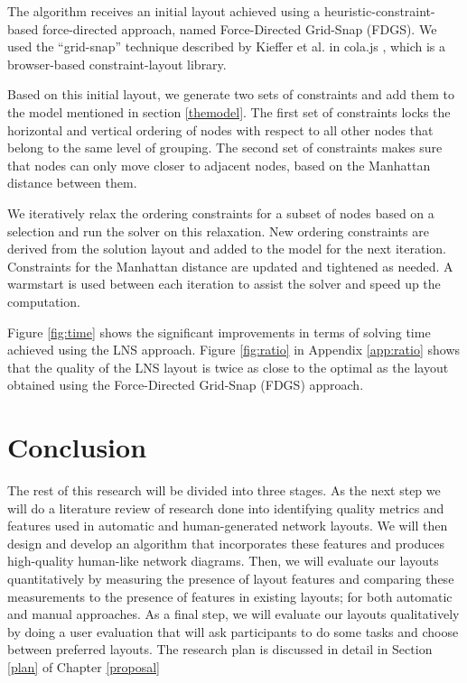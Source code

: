 \documentclass[a4paper,11pt,phdthesis,singlespace,twoside]{cssethesis}
\begin{document}
The algorithm receives an initial layout achieved using a heuristic-constraint-based force-directed approach, named Force-Directed Grid-Snap (FDGS). We used the
“grid-snap” technique described by Kieffer et al. \cite{kieffer2013incremental} in cola.js
\cite{webcola}, which is a browser-based constraint-layout library. 

Based on this initial layout, we generate two sets of constraints and add them to the model mentioned in section \ref{themodel}. The first set of constraints locks the horizontal and vertical ordering of nodes with respect to all other nodes that belong to the same level of grouping. The second set of constraints makes sure that nodes can only move closer to adjacent nodes, based on the Manhattan distance between them. 

We iteratively relax the ordering constraints for a subset of nodes based on a selection and run the solver on this relaxation. New ordering constraints are derived from the solution layout and added to the model for the next iteration. Constraints for the Manhattan distance are updated and tightened as needed. A warmstart is used between each iteration to assist the solver and speed up the computation.

Figure \ref{fig:time} shows the significant improvements in terms of solving time achieved using the LNS approach. Figure \ref{fig:ratio} in Appendix \ref{app:ratio} shows that the  quality of the LNS layout is twice as close to the optimal as the layout obtained using the Force-Directed Grid-Snap (FDGS) approach.

\section{Conclusion}

The rest of this research will be divided into three stages. As the next step we will do a literature review of research done into identifying quality metrics and features used in automatic and human-generated network layouts. We will then design and develop an algorithm that incorporates these features and produces high-quality human-like network diagrams. Then, we will evaluate our layouts quantitatively by measuring the presence of layout features and comparing these measurements to the presence of features in existing layouts; for both automatic and manual approaches. As a final step, we will evaluate our layouts qualitatively by doing a user evaluation that will ask participants to do some tasks and choose between preferred layouts. The research plan is discussed in detail in Section \ref{plan} of Chapter \ref{proposal}
\end{document}

